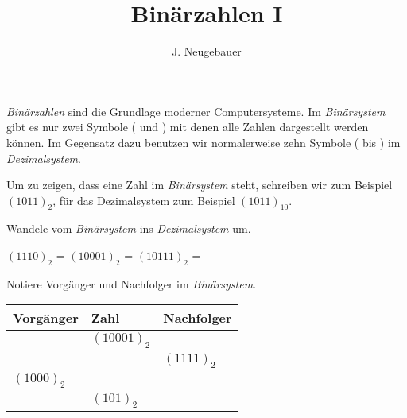 \documentclass[10pt, a5paper]{scrartcl}
\author{J. Neugebauer}
\title{Binärzahlen I}
\date{\Heute}
\begin{document}
\ReiheTitel

\emph{Binärzahlen} sind die Grundlage moderner Computersysteme. Im \emph{Binärsystem} gibt es nur zwei Symbole ( und ) mit denen alle Zahlen dargestellt werden können. Im Gegensatz dazu benutzen wir normalerweise zehn Symbole ( bis ) im \emph{Dezimalsystem}.

Um zu zeigen, dass eine Zahl im \emph{Binärsystem} steht, schreiben wir zum Beispiel $(1011)_2$, für das Dezimalsystem zum Beispiel $(1011)_{10}$.

\begin{aufgabe}[subtitle=Binärzahlen umrechnen]
	Wandele vom \emph{Binärsystem} ins \emph{Dezimalsystem} um.
	
	\begin{teilaufgaben}
		\teilaufgabe $(1110)_2$ = 
		\teilaufgabe $(10001)_2$ = 
		\teilaufgabe $(10111)_2$ = 
	\end{teilaufgaben}
\end{aufgabe}

\begin{aufgabe}[subtitle=Vorgänger und Nachfolger]
	Notiere Vorgänger und Nachfolger im \emph{Binärsystem}.
	
	\begin{tabularx}{\textwidth}{|X|X|X|}\hline
		\rowcolor{ngb.tabelle.kopf.hg} Vorgänger & Zahl & Nachfolger \\\hline
		\Zeilenabstand & $(10001)_2$ & \\\hline
		\Zeilenabstand & & $(1111)_2$ \\\hline
		$(1000)_2$ &\Zeilenabstand & \\\hline
		\Zeilenabstand & $(101)_2$ & \\\hline
	\end{tabularx}
\end{aufgabe}
\end{document}
